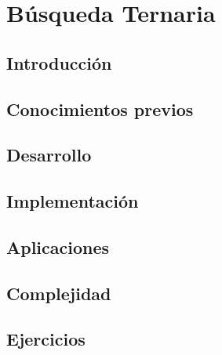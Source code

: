 \chapter{Búsqueda Ternaria}
\section{Introducción}

\section{Conocimientos previos}

\section{Desarrollo}

\section{Implementación}

\section{Aplicaciones}

\section{Complejidad}

\section{Ejercicios}

